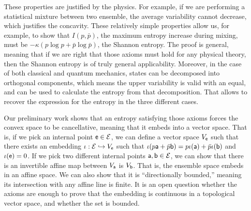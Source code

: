 These properties are justified by the physics. For example, if we are performing a statistical mixture between two ensemble, the average variability cannot decrease, which justifies the concavity. These relatively simple properties allow us, for example, to show that $I(p,\bar{p})$, the maximum entropy increase during mixing, must be $ - \kappa \left(p \log p + \bar{p} \log \bar{p}\right)$, the Shannon entropy. The proof is general, meaning that if we are right that those axioms must hold for any physical theory, then the Shannon entropy is of truly general applicability. Moreover, in the case of both classical and quantum mechanics, states can be decomposed into orthogonal components, which means the upper variability is valid with an equal, and can be used to calculate the entropy from that decomposition. That allows to recover the expression for the entropy in the three different cases.

Our preliminary work shows that an entropy satisfying those axioms forces the convex space to be cancellative, meaning that it embeds into a vector space. That is, if we pick an internal point $\ens \in \Ens$, we can define a vector space $V_{\ens}$ such that there exists an embedding $\iota : \Ens \hookrightarrow  V_{\ens}$ such that $\iota(p \ens[a] + \bar{p} \ens[b]) = p \iota(\ens[a]) + \bar{p} \iota(\ens[b])$ and $\iota(\ens) = 0$. If we pick two different internal points $\ens[a],\ens[b] \in \Ens$, we can show that there is an invertible affine map between $V_{\ens[a]}$ is $V_{\ens[b]}$. That is, the ensemble space embeds in an affine space. We can also show that it is ``directionally bounded,'' meaning its intersection with any affine line is finite. It is an open question whether the axioms are enough to prove that the embedding is continuous in a topological vector space, and whether the set is bounded.

